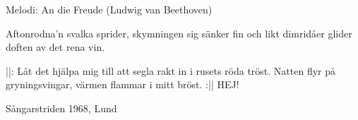 \begin{song}

\begin{songmeta}
Melodi: An die Freude (Ludwig van Beethoven)
\end{songmeta}

\begin{songtext}
Aftonrodna'n svalka sprider,
skymningen sig sänker fin
och likt dimridåer glider
doften av det rena vin.

||: Låt det hjälpa mig till att segla
rakt in i rusets röda tröst.
Natten flyr på gryningsvingar,
värmen flammar i mitt bröst. :||
HEJ!
\end{songtext}

\begin{songnotes}
Sångarstriden 1968, Lund
\end{songnotes}
\end{song}
